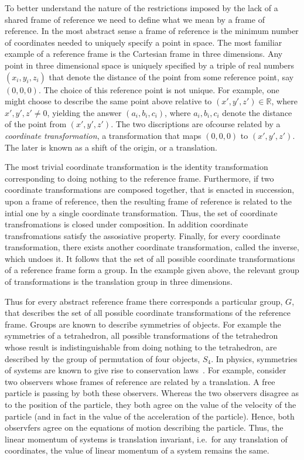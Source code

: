 \documentclass{article}
\newcommand\defn[1]{\textsl{#1}}
\begin{document}
To better understand the nature of the restrictions imposed by the lack of a shared frame of reference we need to define what we mean by a frame of reference.  In the most abstract sense a frame of reference is the minimum number of coordinates needed to uniquely specify a point in space. The most familiar example of a reference frame is the Cartesian frame in three dimensions.  Any point in three dimensional space is uniquely specified by a triple of real numbers $(x_i,y_i,z_i)$ that denote the distance of the point from some reference point, say $(0,0,0)$.  The choice of this reference point is not unique.  For example, one might choose to describe the same point above relative to $(x',y',z')\in\mathbb{R}$, where $x', y', z'\neq0$, yielding the answer $(a_i,b_i,c_i)$, where $a_i, b_i, c_i$ denote the distance of the point from $(x',y',z')$.  The two discriptions are ofcourse related by a \defn{coordinate transformation}, a transformation that maps $(0,0,0)$ to $(x',y',z')$.  The later is known as a shift of the origin, or a translation.

The most trivial coordinate transformation is the identity transformation corresponding to doing nothing to the reference frame. Furthermore, if two coordinate transformations are composed together, that is enacted in succession, upon a frame of reference, then the resulting frame of reference is related to the intial one by a single coordinate transformation.  Thus, the set of coordinate transfromations is closed under composition. In addition coordinate transfromations satisfy the assosiative property.  Finally, for every coordinate transformation, there exists another coordinate transformation, called the inverse, which undoes it. It follows that the set of all possible coordinate transformations of a reference frame form a group.  In the example given above, the relevant group of transformations is the translation group in three dimensions.

Thus for every abstract reference frame there corresponds a particular group, $G$, that describes the set of all possible coordinate transformations of the reference frame. Groups are known to describe symmetries of objects.  For example the symmetries of a tetrahedron, all possible transformations of the tetrahedron whose result is indistinguishable from doing nothing to the tetrahedron, are described by the group of permutation of four objects, $S_4$.  In physics, symmetries of systems are known to give rise to conservation laws~\cite{N18}.  For example, consider two observers whose frames of reference are related by a translation.  A free particle is passing by both these observers. Whereas the two observers disagree as to the position of the particle, they both agree on the value of the velocity of the particle (and in fact in the value of the acceleration of the particle).  Hence, both observfers agree on the equations of motion describing the particle.  Thus, the linear momentum of systems is translation invariant, i.e.~for any translation of coordinates, the value of linear momentum of a system remains the same.  
      
\end{document}
